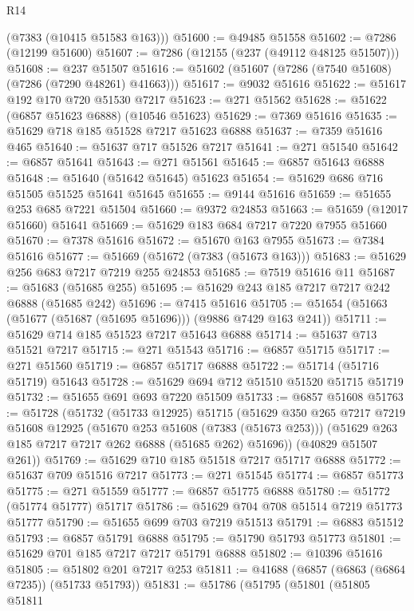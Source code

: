 \begin{lexlean}{R14}
\begin{coremodule}
      (@7383 (@10415 @51583 @163)))
@51600 := @49485 @51558
@51602 := @7286 (@12199 @51600)
@51607 := @7286 (@12155 (@237 (@49112 @48125 @51507)))
@51608 := @237 @51507
@51616 := @51602 (@51607 (@7286 (@7540 @51608) (@7286 (@7290 @48261) @41663)))
@51617 := @9032 @51616
@51622 := @51617 @192 @170 @720 @51530 @7217
@51623 := @271 @51562
@51628 := @51622 (@6857 @51623 @6888) (@10546 @51623)
@51629 := @7369 @51616
@51635 := @51629 @718 @185 @51528 @7217 @51623 @6888
@51637 := @7359 @51616 @465
@51640 := @51637 @717 @51526 @7217
@51641 := @271 @51540
@51642 := @6857 @51641
@51643 := @271 @51561
@51645 := @6857 @51643 @6888
@51648 := @51640 (@51642 @51645) @51623
@51654 := @51629 @686 @716 @51505 @51525 @51641 @51645
@51655 := @9144 @51616
@51659 := @51655 @253 @685 @7221 @51504
@51660 := @9372 @24853
@51663 := @51659 (@12017 @51660) @51641
@51669 := @51629 @183 @684 @7217 @7220 @7955 @51660
@51670 := @7378 @51616
@51672 := @51670 @163 @7955
@51673 := @7384 @51616
@51677 := @51669 (@51672 (@7383 (@51673 @163)))
@51683 := @51629 @256 @683 @7217 @7219 @255 @24853
@51685 := @7519 @51616 @11
@51687 := @51683 (@51685 @255)
@51695 := @51629 @243 @185 @7217 @7217 @242 @6888 (@51685 @242)
@51696 := @7415 @51616
@51705 := @51654 (@51663 (@51677 (@51687 (@51695 @51696))) (@9886 @7429 @163 @241))
@51711 := @51629 @714 @185 @51523 @7217 @51643 @6888
@51714 := @51637 @713 @51521 @7217
@51715 := @271 @51543
@51716 := @6857 @51715
@51717 := @271 @51560
@51719 := @6857 @51717 @6888
@51722 := @51714 (@51716 @51719) @51643
@51728 := @51629 @694 @712 @51510 @51520 @51715 @51719
@51732 := @51655 @691 @693 @7220 @51509
@51733 := @6857 @51608
@51763 := @51728
    (@51732
      (@51733 @12925)
      @51715
      (@51629
        @350
        @265
        @7217
        @7219
        @51608
        @12925
        (@51670 @253 @51608 (@7383 (@51673 @253)))
        (@51629 @263 @185 @7217 @7217 @262 @6888 (@51685 @262) @51696))
      (@40829 @51507 @261))
@51769 := @51629 @710 @185 @51518 @7217 @51717 @6888
@51772 := @51637 @709 @51516 @7217
@51773 := @271 @51545
@51774 := @6857 @51773
@51775 := @271 @51559
@51777 := @6857 @51775 @6888
@51780 := @51772 (@51774 @51777) @51717
@51786 := @51629 @704 @708 @51514 @7219 @51773 @51777
@51790 := @51655 @699 @703 @7219 @51513
@51791 := @6883 @51512
@51793 := @6857 @51791 @6888
@51795 := @51790 @51793 @51773
@51801 := @51629 @701 @185 @7217 @7217 @51791 @6888
@51802 := @10396 @51616
@51805 := @51802 @201 @7217 @253
@51811 := @41688 (@6857 (@6863 (@6864 @7235)) (@51733 @51793))
@51831 := @51786
    (@51795
      (@51801
        (@51805
          @51811

\end{coremodule}
\end{lexlean}

